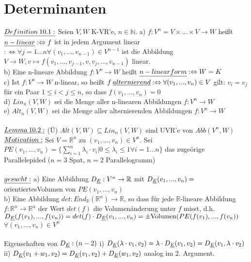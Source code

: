 \documentclass[fleqn, a4paper, 11pt]{scrartcl}
\newcommand{\NN}{\mathbb{N}}
\newcommand{\RR}{\mathbb{R}}
\theoremstyle{definition}
\begin{document}
\section{Determinanten}

$\uline{Definition\:10.1:}$ Seien $V,W$ K-VR'e, $n\in\NN$. a) $f:V^n=V\times\dots\times V\rightarrow W$ heißt $\uline{n-linear}:\Leftrightarrow f$ ist in jedem Argument linear $:\Leftrightarrow\forall j=1...n\forall(v_1,...,v_{n-1})\in V^{n-1}$ ist die Abbildung $V\rightarrow W,v\mapsto f(v_1,...,v_{j-1},v,v_j,...,v_{n-1})$ linear.\\
b) Eine n-lineare Abbildung $f:V^n\rightarrow W$ heißt $\uline{n-linearform}:\Leftrightarrow W=K$\\
c) Ist $f:V^n\rightarrow W$ n-linear, so heißt $f\:\uline{alternierend}:\Leftrightarrow \forall(v_1,...,v_n)\in V$ gilt: $v_i=v_j$ für ein Paar $1\leq i<j\leq n$, so dass $f(v_1,...,v_n)=0$\\
d) $Lin_n(V,W)$ sei die Menge aller n-linearen Abbildungen $f:V^n\rightarrow W$\\
e) $Alt_n(V,W)$ sei die Menge aller alternierenden Abbildungen $f:V^n\rightarrow W$\\
\\
$\uline{Lemma\:10.2:}$ (\"U) $Alt(V,W)\subseteq Lin_n(V,W)$ sind UVR'e von $Abb(V^n,W)$\\
$\uline{Motivation:}$ Sei $V=\RR^n$ zu $(v_1,...,v_n)\in V^n$. Sei $PE(v_1,...,v_n)=\{\sum\limits_{i=1}^n \lambda_i\cdot v_i | 0\leq \lambda_i \leq 1 \forall i=1...n\}$ das zugeörige Parallelepided ($n=3$ Spat, $n=2$ Parallelogramm)\\
\\
$\uline{gesucht:}$ a) Eine Abbildung $D_{\uline{E}}:V^n\rightarrow\RR$ mit $D_{\uline{E}}(v_1,...,v_n)=$\dq orientiertes\dq Volumen von $PE(v_1,...,v_n)$\\
b) Eine Abbildung $det:End_{\RR}(\RR^n)\rightarrow\RR$, so dass für jede $\RR$-lineare Abbildung $f:\RR^n\rightarrow\RR^n$ der Wert $det(f)$ die Volumenänderung unter $f$ misst, d.h. $D_{\uline{E}}(f(v_1),...,f(v_n))=det(f)\cdot D_{\uline{E}}(v_1,...,v_n)=\pm \text{Volumen}(PE(f(v_1),...,f(v_n))$ $\forall(v_1,...,v_n)\in V^n$\\
\\
Eigenschaften von $D_{\uline{E}}:(n-2)$ i) $D_{\uline{E}}(\lambda\cdot v_1,v_2)=\lambda\cdot D_{\uline{E}}(v_1,v_2)=D_{\uline{E}}(v_1,\lambda\cdot v_2)$\\
ii) $D_{\uline{E}}(v_1 +w_1,v_2)=D_{\uline{E}}(v_1,v_2)+D_{\uline{E}}(w_1,v_2)$ analog im 2. Argument.\\
\end{document}
